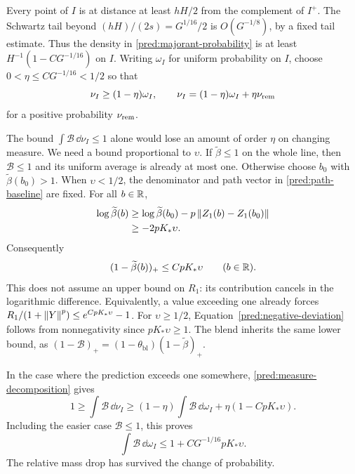 Every point of \(I\) is at distance at least \(hH/2\) from the
complement of \(I^+\). The Schwartz tail beyond
\((hH)/(2s)=G^{1/16}/2\) is \(O(G^{-1/8})\), by a fixed tail estimate.
Thus the density in \eqref{pred:majorant-probability} is at least
\(H^{-1}(1-CG^{-1/16})\) on \(I\).
Writing \(\omega_I\) for uniform probability on \(I\), choose
\(0<\eta\le CG^{-1/16}<1/2\) so that
\begin{equation}
 \nu_I\ge(1-\eta)\omega_I,\qquad
 \nu_I=(1-\eta)\omega_I+\eta\nu_{\rm rem}
 \label{pred:measure-decomposition}
\end{equation}
for a positive probability \(\nu_{\rm rem}\).

The bound \(\int \mathcal B\,\dd\nu_I\le1\) alone would lose an amount of
order \(\eta\) on changing measure. We need a bound proportional to
\(\upsilon\).
If \(\widetilde\beta\le1\) on the whole line, then \(\mathcal B\le1\) and
its uniform average is already at most one.
Otherwise choose \(b_0\) with \(\widetilde\beta(b_0)>1\).
When \(\upsilon<1/2\), the denominator and path vector in
\eqref{pred:path-baseline} are fixed. For all \(b\in\mathbb R\),
\begin{align*}
 \log\widetilde\beta(b)
 &\ge\log\widetilde\beta(b_0)
          -p\left\|Z_1(b)-Z_1(b_0)\right\|\\
 &\ge-2pK_*\upsilon.
\end{align*}
Consequently
\begin{equation}
 (1-\widetilde\beta(b))_+\le CpK_*\upsilon
       \qquad(b\in\mathbb R).
 \label{pred:negative-deviation}
\end{equation}
This does not assume an upper bound on \(R_1\): its contribution
cancels in the logarithmic difference. Equivalently, a value exceeding
one already forces
\(R_1/(1+\left\|Y\right\|^p)\le e^{CpK_*\upsilon}-1\).
For \(\upsilon\ge1/2\), Equation~\eqref{pred:negative-deviation}
follows from nonnegativity since \(pK_*\upsilon\ge1\).
The blend inherits the same lower bound, as
\((1-\mathcal B)_+=(1-\theta_{\mathrm{bl}})(1-\widetilde\beta)_+\).

In the case where the prediction exceeds one somewhere,
\eqref{pred:measure-decomposition} gives
\[
 1\ge\int \mathcal B\,\dd\nu_I
 \ge(1-\eta)\int \mathcal B\,\dd\omega_I
           +\eta(1-CpK_*\upsilon).
\]
Including the easier case \(\mathcal B\le1\), this proves
\begin{equation}
 \int \mathcal B\,\dd\omega_I\le1+C G^{-1/16}pK_*\upsilon.
 \label{pred:uniform-average}
\end{equation}
The relative mass drop has survived the change of probability.

